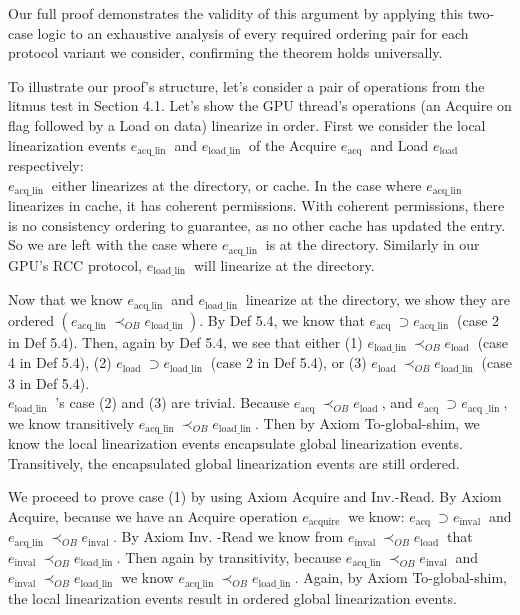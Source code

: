\documentclass[10pt]{article}
\begin{document}
Our full proof demonstrates the validity of this argument by applying this two-case logic to an exhaustive analysis of every required ordering pair for each protocol variant we consider, confirming the theorem holds universally.

To illustrate our proof's structure, let's consider a pair of operations from the litmus test in Section 4.1. Let's show the GPU thread's operations (an Acquire on flag followed by a Load on data) linearize in order. First we consider the local linearization events $e_{\text {acq_lin }}$ and $e_{\text {load_lin }}$ of the Acquire $e_{\text {acq }}$ and Load $e_{\text {load }}$ respectively:\\
$e_{\text {acq_lin }}$ either linearizes at the directory, or cache. In the case where $e_{\text {acq_lin }}$ linearizes in cache, it has coherent permissions. With coherent permissions, there is no consistency ordering to guarantee, as no other cache has updated the entry. So we are left with the case where $e_{\text {acq_lin }}$ is at the directory. Similarly in our GPU's RCC protocol, $e_{\text {load_lin }}$ will linearize at the directory.

Now that we know $e_{\text {acq_lin }}$ and $e_{\text {load_lin }}$ linearize at the directory, we show they are ordered $\left(e_{\text {acq_lin }} \prec_{O B} e_{\text {load_lin }}\right)$. By Def 5.4, we know that $e_{\text {acq }} \supset e_{\text {acq_lin }}$ (case 2 in Def 5.4). Then, again by Def 5.4, we see that either (1) $e_{\text {load_lin }} \prec_{O B} e_{\text {load }}$ (case 4 in Def 5.4), (2) $e_{\text {load }} \supset e_{\text {load_lin }}$ (case 2 in Def 5.4), or (3) $e_{\text {load }} \prec_{O B} e_{\text {load_lin }}$ (case 3 in Def 5.4).\\
$e_{\text {load_lin }}$ 's case (2) and (3) are trivial. Because $e_{\text {acq }} \prec_{O B} e_{\text {load }}$, and $e_{\text {acq }} \supset e_{\text {acq } \_ \text {lin }}$, we know transitively $e_{\text {acq_lin }} \prec_{O B} e_{\text {load_lin }}$. Then by Axiom To-global-shim, we know the local linearization events encapsulate global linearization events. Transitively, the encapsulated global linearization events are still ordered.

We proceed to prove case (1) by using Axiom Acquire and Inv.-Read. By Axiom Acquire, because we have an Acquire operation $e_{\text {acquire }}$ we know: $e_{\text {acq }} \supset e_{\text {inval }}$ and $e_{\text {acq_lin }} \prec_{O B} e_{\text {inval }}$. By Axiom Inv. -Read we know from $e_{\text {inval }} \prec_{O B} e_{\text {load }}$ that $e_{\text {inval }} \prec_{O B} e_{\text {load_lin }}$. Then again by transitivity, because $e_{\text {acq_lin }} \prec_{O B} e_{\text {inval }}$ and $e_{\text {inval }} \prec_{O B} e_{\text {load_lin }}$ we know $e_{\text {acq_lin }} \prec_{O B} e_{\text {load_lin }}$. Again, by Axiom To-global-shim, the local linearization events result in ordered global linearization events.
\end{document}
